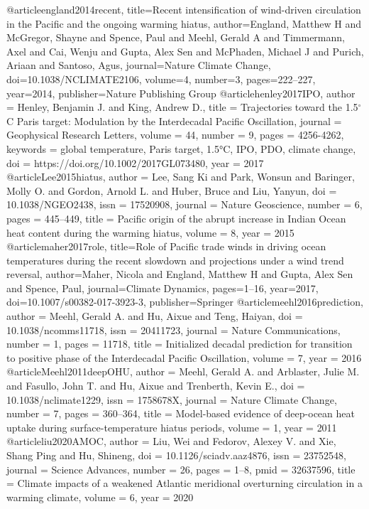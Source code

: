 @article{england2014recent,
 title={{Recent intensification of wind-driven circulation in the Pacific and the ongoing warming hiatus}},
 author={England, Matthew H and McGregor, Shayne and Spence, Paul and Meehl, Gerald A and Timmermann, Axel and Cai, Wenju and Gupta, Alex Sen and McPhaden, Michael J and Purich, Ariaan and Santoso, Agus},
 journal={Nature Climate Change},
 doi={10.1038/NCLIMATE2106},
 volume={4},
 number={3},
 pages={222--227},
 year={2014},
 publisher={Nature Publishing Group}
}
@article{henley2017IPO,
author = {Henley, Benjamin J. and King, Andrew D.},
title = {{Trajectories toward the 1.5$^{\circ}$C Paris target: Modulation by the Interdecadal Pacific Oscillation}},
journal = {Geophysical Research Letters},
volume = {44},
number = {9},
pages = {4256-4262},
keywords = {global temperature, Paris target, 1.5°C, IPO, PDO, climate change},
doi = {https://doi.org/10.1002/2017GL073480},
year = {2017}
}
@article{Lee2015hiatus,
author = {Lee, Sang Ki and Park, Wonsun and Baringer, Molly O. and Gordon, Arnold L. and Huber, Bruce and Liu, Yanyun},
doi = {10.1038/NGEO2438},
issn = {17520908},
journal = {Nature Geoscience},
number = {6},
pages = {445--449},
title = {{Pacific origin of the abrupt increase in Indian Ocean heat content during the warming hiatus}},
volume = {8},
year = {2015}
}
@article{maher2017role,
 title={{Role of Pacific trade winds in driving ocean temperatures during the recent slowdown and projections under a wind trend reversal}},
 author={Maher, Nicola and England, Matthew H and Gupta, Alex Sen and Spence, Paul},
 journal={Climate Dynamics},
 pages={1--16},
 year={2017},
 doi={10.1007/s00382-017-3923-3},
 publisher={Springer}
}
@article{meehl2016prediction,
author = {Meehl, Gerald A. and Hu, Aixue and Teng, Haiyan},
doi = {10.1038/ncomms11718},
issn = {20411723},
journal = {Nature Communications},
number = {1},
pages = {11718},
title = {{Initialized decadal prediction for transition to positive phase of the Interdecadal Pacific Oscillation}},
volume = {7},
year = {2016}
}
@article{Meehl2011deepOHU,
author = {Meehl, Gerald A. and Arblaster, Julie M. and Fasullo, John T. and Hu, Aixue and Trenberth, Kevin E.},
doi = {10.1038/nclimate1229},
issn = {1758678X},
journal = {Nature Climate Change},
number = {7},
pages = {360--364},
title = {{Model-based evidence of deep-ocean heat uptake during surface-temperature hiatus periods}},
volume = {1},
year = {2011}
}
@article{liu2020AMOC,
author = {Liu, Wei and Fedorov, Alexey V. and Xie, Shang Ping and Hu, Shineng},
doi = {10.1126/sciadv.aaz4876},
issn = {23752548},
journal = {Science Advances},
number = {26},
pages = {1--8},
pmid = {32637596},
title = {{Climate impacts of a weakened Atlantic meridional overturning circulation in a warming climate}},
volume = {6},
year = {2020}
}
